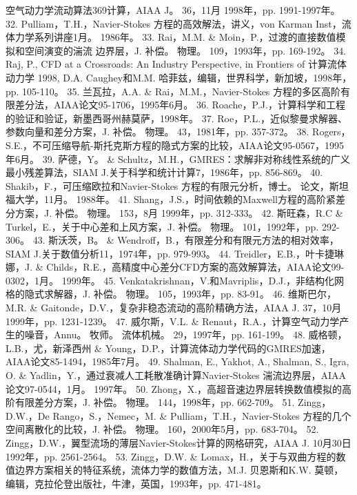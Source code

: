 \documentclass[UTF8,11pt,a4paper,openany,fontset=fandol]{ctexbook}
\begin{document}
空气动力学流动算法369计算，AIAA J。 36，11月 1998年，pp. 1991-1997年。 32. Pulliam，T.H.，Navier-Stokes 方程的高效解法，讲义，von Karman Inst，流体力学系列讲座1月。 1986年。 33. Rai，M.M. \& Moin，P.，过渡的直接数值模拟和空间演变的湍流 边界层，J. 补偿。 物理。 109，1993年，pp. 169-192。 34. Raj, P., CFD at a Crossroads: An Industry Perspective, in Frontiers of 计算流体动力学 1998, D.A. Caughey和M.M. 哈菲兹，编辑，世界科学，新加坡，1998年，pp. 105-110。 35. 兰瓦拉，A.A. \& Rai，M.M.，Navier-Stokes 方程的多区高阶有限差分法，AIAA论文95-1706，1995年6月。 36. Roache，P.J.，计算科学和工程的验证和验证，新墨西哥州赫莫萨，1998年。 37. Roe，P.L.，近似黎曼求解器、参数向量和差分方案，J. 补偿。 物理。 43，1981年，pp. 357-372。 38. Rogers，S.E.，不可压缩导航-斯托克斯方程的隐式方案的比较，AIAA论文95-0567，1995年6月。 39. 萨德，Y。 \& Schultz，M.H.，GMRES：求解非对称线性系统的广义最小残差算法，SIAM J.关于科学和统计计算7，1986年，pp. 856-869。 40. Shakib，F.，可压缩欧拉和Navier-Stokes 方程的有限元分析，博士。 论文，斯坦福大学，11月。 1988年。 41. Shang，J.S.，时间依赖的Maxwell方程的高阶紧差分方案，J. 补偿。 物理。 153，8月 1999年，pp. 312-333。 42. 斯旺森，R.C \& Turkel，E.，关于中心差和上风方案，J. 补偿。 物理。 101，1992年，pp. 292-306。 43. 斯沃茨，B。 \& Wendroff，B.，有限差分和有限元方法的相对效率，SIAM J.关于数值分析11，1974年，pp. 979-993。 44. Treidler，E.B.，叶卡捷琳娜，J. \& Childs，R.E.，高精度中心差分CFD方案的高效解算法，AIAA论文99-0302，1月。 1999年。 45. Venkatakrishnan，V.和Mavriplis，D.J.，非结构化网格的隐式求解器，J. 补偿。 物理。 105，1993年，pp. 83-91。 46. 维斯巴尔，M.R. \& Gaitonde，D.V.，复杂非稳态流动的高阶精确方法，AIAA J. 37，10月 1999年，pp. 1231-1239。 47. 威尔斯，V.L. \& Renaut，R.A.，计算空气动力学产生的噪音，Annu。 牧师。 流体机械。 29，1997年，pp. 161-199。 48. 威格顿，L.B.，尤，新泽西州 \& Young，D.P.，计算流体动力学代码的GMRES加速，AIAA论文85-1494，1985年7月。 49. Shalman, E., Yakhot, A., Shalman, S., Igra, O. \& Yadlin，Y.，通过衰减人工耗散准确计算Navier-Stokes 湍流边界层，AIAA论文97-0544，1月。 1997年。 50. Zhong，X.，高超音速边界层转换数值模拟的高阶有限差分方案，J. 补偿。 物理。 144，1998年，pp. 662-709。 51. Zingg，D.W.，De Rango，S.，Nemec，M. \& Pulliam，T.H.，Navier-Stokes 方程的几个空间离散化的比较，J. 补偿。 物理。 160，2000年5月，pp. 683-704。 52. Zingg，D.W.，翼型流场的薄层Navier-Stokes计算的网格研究，AIAA J. 10月30日 1992年，pp. 2561-2564。 53. Zingg，D.W. \& Lomax，H.，关于与双曲方程的数值边界方案相关的特征系统，流体力学的数值方法，M.J. 贝恩斯和K.W. 莫顿，编辑，克拉伦登出版社，牛津，英国，1993年，pp. 471-481。
\end{document}
